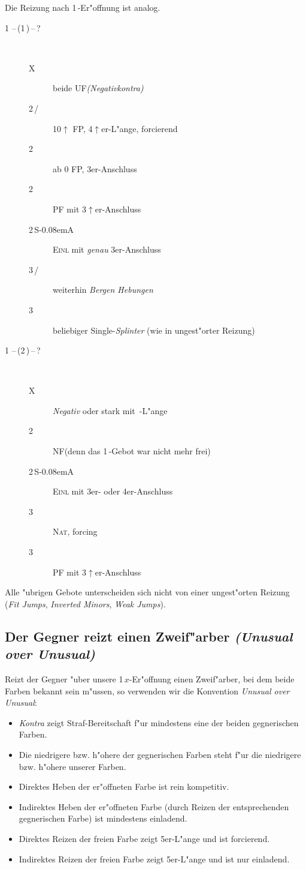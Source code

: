 \documentclass[11pt,german,twocolumn]{scrartcl}
\def\pik{\nobreak\,\Sp\xspace}
\def\coe{\nobreak\,\He\xspace}
\def\kar{\nobreak\,\Di\xspace}
\def\tre{\nobreak\,\Cl\xspace}
\def\ka{\Di\xspace}
\def\pl{$\uparrow$\xspace}
\def\ufa{\nobreak\textsf{UF}\xspace}
\def\sa{\nobreak\textsf{S\kern-0.08emA}\xspace}
\def\SA{\nobreak\,\sa}
\def\kontra{\textsf{X}\xspace}
\def\sep{\,--\,}
\newcommand{\conv}[1]{\emph{#1}}
\def\nat{\textsc{Nat}\xspace}
\def\pf{\textsc{PF}\xspace}
\def\inv{\textsc{Einl}\xspace}
\def\nf{\textsc{NF}\xspace}
\def\bdsc{\begin{description}}
\def\edsc{\end{description}}
\begin{document}
Die Reizung nach 1\kar-Er"offnung ist analog.

\bdsc
\item[1\coe{}\sep(1\pik){}\sep?]~
\bdsc
\item[\kontra] beide \ufa \conv{(Negativkontra)}
\item[2\tre/\ka] 10\pl FP, 4\pl{}er-L"ange, forcierend
\item[2\coe] ab 0 FP, 3er-Anschluss
\item[2\pik] \pf mit 3\pl{}er-Anschluss
\item[2\SA] \inv mit \emph{genau} 3er-Anschluss
\item[3\tre/\ka] weiterhin \conv{Bergen Hebungen}
\item[3\pik] beliebiger Single-\conv{Splinter} (wie in ungest"orter
  Reizung)
\edsc
\item[1\coe{}\sep(2\kar){}\sep?]~
\bdsc
\item[\kontra] \conv{Negativ} oder stark mit \pik-L"ange
\item[2\pik] \nf (denn das 1\pik-Gebot war nicht mehr frei)
\item[2\SA] \inv mit 3er- oder 4er-Anschluss
\item[3\tre] \nat, forcing
\item[3\kar] \pf mit 3\pl{}er-Anschluss
\edsc
\edsc

Alle "ubrigen Gebote unterscheiden sich nicht von einer ungest"orten
Reizung (\conv{Fit Jumps}, \conv{Inverted Minors}, \conv{Weak Jumps}).

\subsection{Der Gegner reizt einen Zweif"arber \conv{(Unusual over
    Unusual)}}

Reizt der Gegner "uber unsere 1\,$x$-Er"offnung einen Zweif"arber, bei
dem beide Farben bekannt sein m"ussen, so verwenden wir die Konvention
\conv{Unusual over Unusual}:
\begin{itemize}
\item \conv{Kontra} zeigt Straf-Bereitschaft f"ur mindestens eine der
  beiden gegnerischen Farben.
\item Die niedrigere bzw. h"ohere der gegnerischen Farben steht
  f"ur die niedrigere bzw. h"ohere unserer Farben.
\item Direktes Heben der er"offneten Farbe ist rein kompetitiv.
\item Indirektes Heben der er"offneten Farbe (durch Reizen der
  entsprechenden gegnerischen Farbe) ist mindestens einladend.
\item Direktes Reizen der freien Farbe zeigt 5er-L"ange und ist
  forcierend.
\item Indirektes Reizen der freien Farbe zeigt 5er-L"ange und ist nur
  einladend.
\end{itemize}
\end{document}
